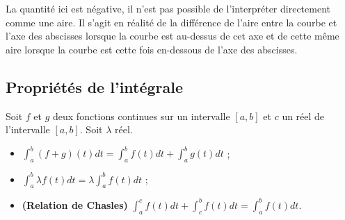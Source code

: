 \documentclass[11pt,fleqn, openany]{book} %
\begin{document}
La quantité ici est négative, il n'est pas possible de l'interpréter directement comme une aire. Il s'agit en réalité de la différence de l'aire entre la courbe et l'axe des abscisses lorsque la courbe est au-dessus de cet axe et de cette même aire lorsque la courbe est cette fois en-dessous de l'axe des abscisses.
\begin{center}
\end{center}



\subsection{Propriétés de l'intégrale}

 \begin{proposition}Soit $f$ et $g$ deux fonctions continues sur un intervalle $[a,b]$ et $c$ un réel de l'intervalle $[a,b]$. Soit $\lambda$ réel.
 
 \begin{itemize}
 \item $\displaystyle\int_{a}^b (f+g)(t)dt=\displaystyle\int_{a}^b f(t)dt+\displaystyle\int_{a}^b g(t)dt$ ;
 \item $\displaystyle\int_{a}^b \lambda f(t)dt=\lambda\displaystyle\int_{a}^b f(t)dt$ ;
 \item \textbf{(Relation de Chasles)} $\displaystyle\int_{a}^c f(t)dt+\displaystyle\int_{c}^b f(t)dt = \displaystyle\int_{a}^b f(t)dt$.
 \end{itemize}\end{proposition}
 
\end{document}
